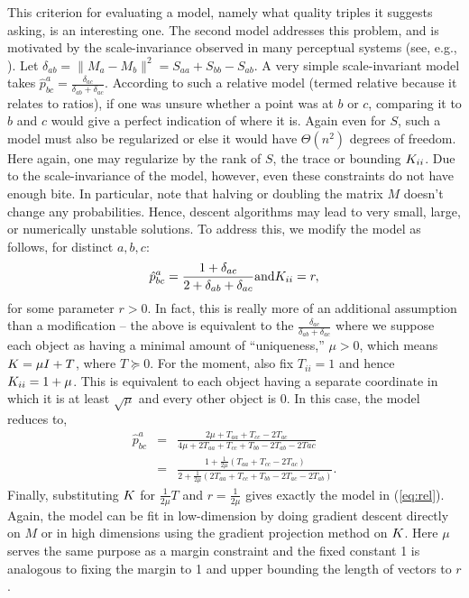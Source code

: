 \documentclass{article}
\begin{document}
This criterion for evaluating a model, namely what quality triples it suggests asking, is an interesting one.  The second model addresses this problem, and is motivated by the scale-invariance observed in many perceptual systems (see, e.g., \citealp{CB99}).  Let $\delta_{ab} = \|M_a-M_b\|^2=S_{aa}+S_{bb}-S_{ab}$.  A very simple scale-invariant model takes $\hat{p}^a_{bc} = \frac{\delta_{ac}}{\delta_{ab}+\delta_{ac}}$.  According to such a relative model (termed relative because it relates to ratios), if one was unsure whether a point was at $b$ or $c$, comparing it to $b$ and $c$ would give a perfect indication of where it is.  Again even for $S$, such a model must also be regularized or else it would have $\Theta(n^2)$ degrees of freedom.  Here again, one may regularize by the rank of $S$, the trace or bounding $\S_{ii}$.  Due to the scale-invariance of the model, however, even these constraints do not have enough bite.  In particular, note that halving or doubling the matrix $M$ doesn't change any probabilities.  Hence, descent algorithms may lead to very small, large, or numerically unstable solutions.  To address this, we modify the model as follows, for distinct $a,b,c$:
\begin{equation}
\label{eq:rel}
\hat{p}^a_{bc} =  \frac{1+\delta_{ac}}{2+\delta_{ab}+\delta_{ac}} \mathrm{ and } \S_{ii}=r,
\end{equation}
for some parameter $r>0$.  In fact, this is really more of an additional assumption than a modification -- the above is equivalent to the $\frac{\delta_{ac}}{\delta_{ab}+\delta_{ac}}$ where we suppose each object as having a minimal amount of ``uniqueness,'' $\mu>0$, which means $\S = \mu I + T$, where $T \succeq 0$. For the moment, also fix $T_{ii}=1$ and hence $\S_{ii}=1+\mu$.  This is equivalent to each object having a separate coordinate in which it is at least $\sqrt{\mu}$ and every other object is 0.  In this case, the model reduces to,
\begin{eqnarray*}
\hat{p}^a_{bc} &=& \frac{2\mu + T_{aa}+T_{cc}-2T_{ac}}{4\mu+2T_{aa}+T_{cc}+T_{bb}-2T_{ab}-2T{ac}}\\
&=&\frac{1 + \frac{1}{2\mu}(T_{aa}+T_{cc}-2T_{ac})}{2 + \frac{1}{2\mu}(2T_{aa}+T_{cc}+T_{bb}-2T_{ac}-2T_{ab})}.
\end{eqnarray*}
Finally, substituting $\S$ for $\frac{1}{2\mu}T$ and $r=\frac{1}{2\mu}$ gives exactly the model in (\ref{eq:rel}).  Again, the model can be fit in low-dimension by doing gradient descent directly on $M$ or in high dimensions using the gradient projection method on $\S$.  Here $\mu$ serves the same purpose as a margin constraint and the fixed constant 1 is analogous to fixing the margin to 1 and upper bounding the length of vectors to $r$. 
\end{document}
